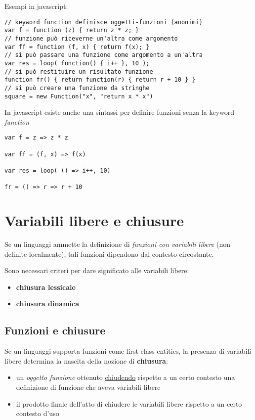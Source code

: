 Esempi in javascript:
\begin{verbatim}
// keyword function definisce oggetti-funzioni (anonimi)
var f = function (z) { return z * z; }
// funzione può riceverne un'altra come argomento
var ff = function (f, x) { return f(x); }
// si può passare una funzione come argomento a un'altra
var res = loop( function() { i++ }, 10 );
// si può restituire un risultato funzione
function fr() { return function(r) { return r + 10 } }
// si può creare una funzione da stringhe
square = new Function("x", "return x * x")
\end{verbatim}

In javascript esiste anche una sintassi per definire funzioni senza la keyword \textit{function}
\begin{verbatim}
var f = z => z * z

var ff = (f, x) => f(x)

var res = loop( () => i++, 10)

fr = () => r => r + 10
\end{verbatim}

\section{Variabili libere e chiusure}
Se un linguaggi ammette la definizione di \textit{funzioni con variabili libere} (non definite localmente), tali funzioni dipendono dal contesto circostante.

Sono necessari criteri per dare significato alle variabili libere:
\begin{itemize}
    \item \textbf{chiusura lessicale}
    \item \textbf{chiusura dinamica}
\end{itemize}

\subsection{Funzioni e chiusure}
Se un linguaggi supporta funzioni come first-class entities, la presenza di variabili libere determina la nascita della nozione di \textbf{chiusura}:
\begin{itemize}
    \item un \textit{oggetto funzione} ottenuto \underline{chiudendo} rispetto a un certo contesto una definizione di funzione che aveva variabili libere
    \item il prodotto finale dell'atto di chiudere le variabili libere rispetto a un certo contesto d'uso
\end{itemize}

